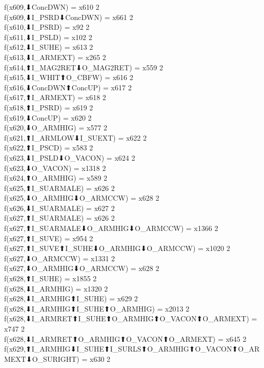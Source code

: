 f(x609,⬇ConcDWN) = x610 {2} \\
f(x609,⬇I_PSRD⬇ConcDWN) = x661 {2} \\
f(x610,⬇I_PSRD) = x92 {2} \\
f(x611,⬇I_PSLD) = x102 {2} \\
f(x612,⬇I_SUHE) = x613 {2} \\
f(x613,⬇I_ARMEXT) = x265 {2} \\
f(x614,⬆I_MAG2RET⬇O_MAG2RET) = x559 {2} \\
f(x615,⬇I_WHIT⬆O_CBFW) = x616 {2} \\
f(x616,⬇ConcDWN⬆ConcUP) = x617 {2} \\
f(x617,⬆I_ARMEXT) = x618 {2} \\
f(x618,⬆I_PSRD) = x619 {2} \\
f(x619,⬇ConcUP) = x620 {2} \\
f(x620,⬇O_ARMHIG) = x577 {2} \\
f(x621,⬆I_ARMLOW⬇I_SUEXT) = x622 {2} \\
f(x622,⬆I_PSCD) = x583 {2} \\
f(x623,⬇I_PSLD⬇O_VACON) = x624 {2} \\
f(x623,⬇O_VACON) = x1318 {2} \\
f(x624,⬆O_ARMHIG) = x589 {2} \\
f(x625,⬆I_SUARMALE) = x626 {2} \\
f(x625,⬇O_ARMHIG⬇O_ARMCCW) = x628 {2} \\
f(x626,⬇I_SUARMALE) = x627 {2} \\
f(x627,⬆I_SUARMALE) = x626 {2} \\
f(x627,⬆I_SUARMALE⬇O_ARMHIG⬇O_ARMCCW) = x1366 {2} \\
f(x627,⬆I_SUVE) = x954 {2} \\
f(x627,⬆I_SUVE⬆I_SUHE⬇O_ARMHIG⬇O_ARMCCW) = x1020 {2} \\
f(x627,⬇O_ARMCCW) = x1331 {2} \\
f(x627,⬇O_ARMHIG⬇O_ARMCCW) = x628 {2} \\
f(x628,⬆I_SUHE) = x1855 {2} \\
f(x628,⬇I_ARMHIG) = x1320 {2} \\
f(x628,⬇I_ARMHIG⬆I_SUHE) = x629 {2} \\
f(x628,⬇I_ARMHIG⬆I_SUHE⬆O_ARMHIG) = x2013 {2} \\
f(x628,⬇I_ARMRET⬆I_SUHE⬆O_ARMHIG⬆O_VACON⬆O_ARMEXT) = x747 {2} \\
f(x628,⬇I_ARMRET⬆O_ARMHIG⬆O_VACON⬆O_ARMEXT) = x645 {2} \\
f(x629,⬆I_ARMHIG⬇I_SUHE⬆I_SURLS⬆O_ARMHIG⬆O_VACON⬆O_ARMEXT⬇O_SURIGHT) = x630 {2} \\
